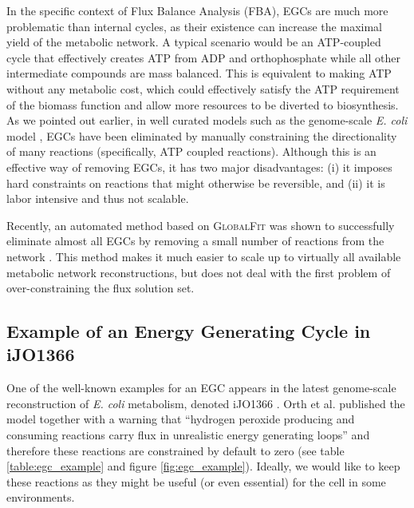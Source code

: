\documentclass[twocolumn]{article}
\begin{document}
In the specific context of Flux Balance Analysis (FBA), EGCs are much more problematic than internal cycles, as their existence can increase the maximal yield of the metabolic network. A typical scenario would be an ATP-coupled cycle that effectively creates ATP from ADP and orthophosphate while all other intermediate compounds are mass balanced. This is equivalent to making ATP without any metabolic cost, which could effectively satisfy the ATP requirement of the biomass function and allow more resources to be diverted to biosynthesis. As we pointed out earlier, in well curated models such as the genome-scale \emph{E. coli} model \cite{Carrera2014-ys}, EGCs have been eliminated by manually constraining the directionality of many reactions (specifically, ATP coupled reactions). Although this is an effective way of removing EGCs, it has two major disadvantages: (i) it imposes hard constraints on reactions that might otherwise be reversible, and (ii) it is labor intensive and thus not scalable.

Recently, an automated method based on \textsc{GlobalFit} was shown to successfully eliminate almost all EGCs by removing a small number of reactions from the network \cite{Fritzemeier2017-ba}. This method makes it much easier to scale up to virtually all available metabolic network reconstructions, but does not deal with the first problem of over-constraining the flux solution set.

\subsection{Example of an Energy Generating Cycle in iJO1366}
One of the well-known examples for an EGC appears in the latest genome-scale reconstruction of \emph{E. coli} metabolism, denoted iJO1366 \cite{Orth2011-qi}. Orth et al. published the model together with a warning that ``hydrogen peroxide producing and consuming reactions carry flux in unrealistic energy generating loops'' and therefore these reactions are constrained by default to zero (see table \ref{table:egc_example} and figure \ref{fig:egc_example}). Ideally, we would like to keep these reactions as they might be useful (or even essential) for the cell in some environments.
\end{document}
